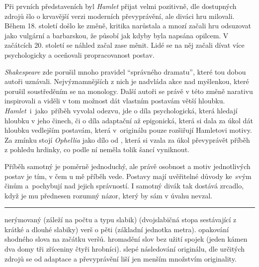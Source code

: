 \documentclass{extarticle} %
\begin{document}

\noindent
Při prvních představeních byl \textit{Hamlet} přijat velmi pozitivně, dle dostupných zdrojů šlo o krvavější verzi moderních převyprávění, ale diváci hru milovali.
Během 18. století došlo ke změně, kritika narůstala a mnozí začali hru odsuzovat jako vulgární a barbarskou, že působí jak kdyby byla napsána opilcem.
V začátcích 20. století se náhled začal zase měnit.
Lidé se na něj začali dívat více psychologicky a oceňovali propracovanost postav.

\noindent
\textit{Shakespeare} zde porušil mnoho pravidel \enquote{správného dramatu},
které tou dobou autoři uznávali.
Nejvýznamnějších z nich je nadvláda akce nad myšlenkou, které porušil soustředěním se na monology.
Další autoři se právě v této změně narativu inspirovali
a viděli v tom možnost dát vlastním postavám větší hloubku.
\textit{Hamlet}~i~jako~příběh vyvolal odezvu, jde o díla psychologická,
která hledají hloubku v jeho činech, či o díla adaptační až epigonická,
která si dala za úkol dát hloubku vedlejším postavám, která v~originálu pouze rozšiřují Hamletovi motivy. \\
Za zmínku stojí \textit{Ophellia} jako dílo od ,
která si vzala za úkol převyprávět příběh z pohledu hrdinky, co podle ní neměla tolik šancí vyniknout.


\noindent 
Příběh samotný je poměrně jednoduchý, ale právě osobnost a motiv jednotlivých postav je tím,
v čem u mě příběh vede.
Postavy mají uvěřitelné důvody ke~svým činům a~pochybují nad jejich správností.
I samotný divák tak dostává zrcadlo, když je mu přednesen rozumný názor, který by sám v úvahu nevzal.
    
\vfill

\noindent\begin{minipage}{\textwidth}
    {\textcolor{\wpagecolor}{\rule{\linewidth}{0.4pt}}
    \changefontsize{5pt}\footnotesize
     nerýmovaný 
    (záleží na počtu a typu slabik) 
    (dvojslabičná stopa sestávající z krátké a dlouhé slabiky) verš o pěti
     (základní jednotka metra).
     opakování shodného slova na začátku veršů.
     hromadění slov bez užití spojek
    (jeden kámen dva domy tři zříceniny čtyři hrobníci).
     slepé následování originálu, dle určitých zdrojů se od adaptace
    a převyprávění liší jen menším množstvím originality.
    }
\end{minipage}
\end{document}
